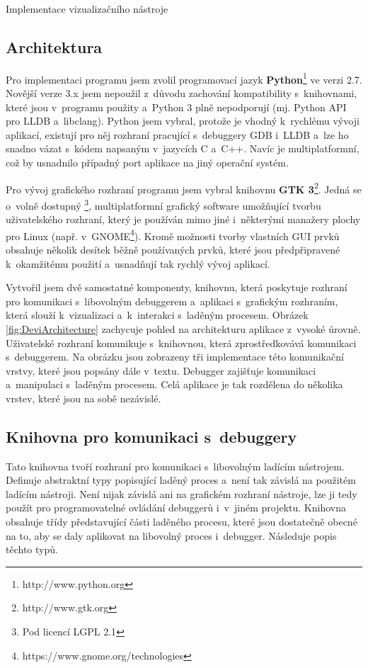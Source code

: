 \documentclass[czech,bachelor,male,python,dept460,hidelinks]{diploma}						%
\newcommand{\parspace}[1][]{
	\ifthenelse{\isempty{#1}}{\vspace{0mm}}{\vspace{#1}}
	\par
}
\begin{document}
\begin{section}{Implementace vizualizačního nástroje}
	\subsection{Architektura}
	\par Pro implementaci programu jsem zvolil programovací jazyk \textbf{Python}\footnote{http://www.python.org} ve verzi 2.7. Novější verze 3.x jsem nepoužil
	z~důvodu zachování kompatibility s~knihovnami, které jsou v~programu použity a~Python 3 plně nepodporují (mj. Python API pro LLDB a~libclang).
	Python jsem vybral, protože je vhodný k~rychlému vývoji aplikací, existují pro něj rozhraní pracující s~debuggery GDB i~LLDB a~lze ho snadno vázat
	s~kódem napsaným v~jazycích C a~C++. Navíc je multiplatformní, což by usnadnilo případný port aplikace na jiný operační systém.
	
	\parspace Pro vývoj grafického rozhraní programu jsem vybral knihovnu \textbf{GTK 3}\footnote{http://www.gtk.org}. Jedná se o~volně dostupný
	\footnote{Pod licencí LGPL 2.1}, multiplatformní grafický software umožňující tvorbu uživatelského rozhraní, který je používán mimo jiné
	i~některými manažery plochy pro Linux (např. v~GNOME\footnote{https://www.gnome.org/technologies}). Kromě možnosti tvorby vlastních
	GUI prvků obsahuje několik desítek běžně používaných prvků, které jsou předpřipravené k~okamžitému použití a~usnadňují tak rychlý vývoj aplikací.
	
	\parspace Vytvořil jsem dvě samostatné komponenty, knihovnu, která poskytuje rozhraní pro komunikaci s~libovolným debuggerem a~aplikaci s~grafickým rozhraním,
	která slouží k~vizualizaci a~k~interakci s~laděným procesem.
	Obrázek \ref{fig:DeviArchitecture} zachycuje pohled na architekturu aplikace z~vysoké úrovně.
	Uživatelské rozhraní komunikuje s~knihovnou, která zprostředkovává komunikaci s~debuggerem. Na obrázku jsou zobrazeny tři implementace této komunikační vrstvy,
	které jsou popsány dále v~textu. Debugger zajišťuje komunikaci a~manipulaci s~laděným procesem. Celá aplikace je tak rozdělena do několika
	vrstev, které jsou na sobě nezávislé.
	
		
	\subsection{Knihovna pro komunikaci s~debuggery}
	\label{sec:DebuggerApi}
		Tato knihovna tvoří rozhraní pro komunikaci s~libovolným ladícím nástrojem. Definuje abstraktní typy popisující laděný proces a~není tak závislá na
		použitém ladícím nástroji. Není nijak závislá ani na grafickém rozhraní nástroje, lze ji tedy použít pro programovatelné ovládání debuggerů i~v~jiném
		projektu. Knihovna obsahuje třídy představující části laděného procesu, které jsou dostatečně obecné na to, aby se daly aplikovat na libovolný
		proces i~debugger. Následuje popis těchto typů.
		

\end{section}
\end{document}
